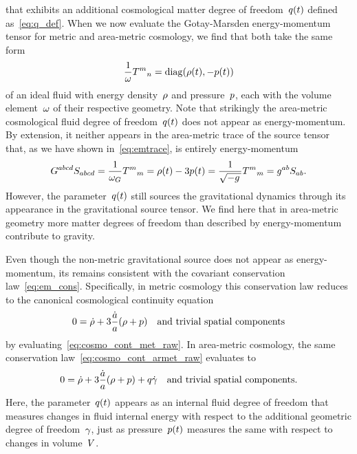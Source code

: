 that exhibits an additional cosmological matter degree of freedom~$q(t)$ defined as~\eqref{eq:q_def}. When we now evaluate the Gotay-Marsden energy-momentum tensor for metric and area-metric cosmology, we find that both take the same form
\begin{equation}\label{eq:emt_fluid}
	\frac{1}{\omega}{T^m}_n=\mathrm{diag}(\rho(t),-p(t))
\end{equation}
of an ideal fluid with energy density~$\rho$ and pressure~$p$, each with the volume element~$\omega$ of their respective geometry. Note that strikingly the area-metric cosmological fluid degree of freedom~$q(t)$ does not appear as energy-momentum. By extension, it neither appears in the area-metric trace of the source tensor that, as we have shown in~\eqref{eq:emtrace}, is entirely energy-momentum
\begin{equation}
	G^{abcd}S_{abcd}=\frac{1}{\omega_G}{T^m}_m=\rho(t)-3p(t)=\frac{1}{\sqrt{-g\,}}{T^m}_m=g^{ab}S_{ab}
	\mathpunct{.}
\end{equation}
However, the parameter~$q(t)$ still sources the gravitational dynamics through its appearance in the gravitational source tensor. We find here that in area-metric geometry more matter degrees of freedom than described by energy-momentum contribute to gravity.

Even though the non-metric gravitational source does not appear as energy-momentum, its remains consistent with the covariant conservation law~\eqref{eq:em_cons}. Specifically, in metric cosmology this conservation law reduces to the canonical cosmological continuity equation
\begin{equation}\label{eq:cosmo_cont_met}
	0=\dot{\rho}+3\frac{\dot{a}}{a}(\rho+p) \quad \text{and trivial spatial components}
\end{equation}
by evaluating~\eqref{eq:cosmo_cont_met_raw}. In area-metric cosmology, the same conservation law~\eqref{eq:cosmo_cont_armet_raw} evaluates to
\begin{equation}\label{eq:cosmo_cont_armet}
	0=\dot{\rho}+3\frac{\dot{a}}{a}(\rho+p)+q\dot{\gamma} \quad \text{and trivial spatial components.}
\end{equation}
Here, the parameter~$q(t)$ appears as an internal fluid degree of freedom that measures changes in fluid internal energy with respect to the additional geometric degree of freedom~$\gamma$, just as pressure~$p(t)$ measures the same with respect to changes in volume~$V$.

